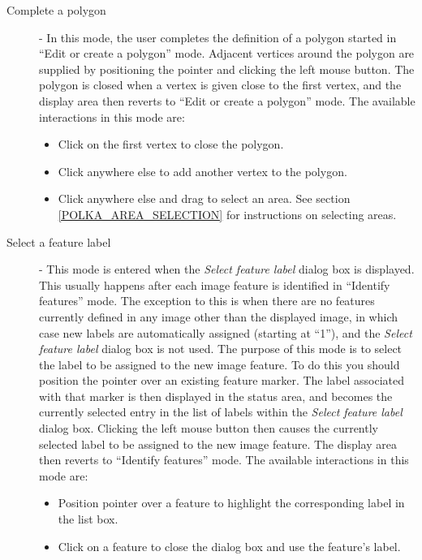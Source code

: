 \documentclass[11pt]{article}
\newcommand{\hyperref}[4]{#2\ref{#4}#3}
\newcommand{\htmlref}[2]{#1}
\newcommand{\xlabel}[1]{}
\newcommand{\mylabel}[1] {\xlabel{#1}\label{#1}}
\begin{document}
\begin{description}
\begin{itemize}
\end{itemize}

\item [\mylabel{POLKA_MODE_2} Complete a polygon] - In this mode, the
user completes the definition of a polygon started in ``\htmlref{Edit or
create a polygon}{POLKA_MODE_1}'' mode. Adjacent vertices around the
polygon are supplied by positioning the pointer and clicking the left
mouse button. The polygon is closed when a vertex is given close to the
first vertex, and the display area then reverts to ``\htmlref{Edit or
create a polygon}{POLKA_MODE_1}'' mode. The available interactions in
this mode are:

\begin{itemize}
\item Click on the first vertex to close the polygon.
\item Click anywhere else to add another vertex to the polygon.
\item Click anywhere else and drag to select an area. \hyperref{Go here}{See
section }{}{POLKA_AREA_SELECTION} for instructions on selecting areas.
\end{itemize}

\item [\mylabel{POLKA_MODE_3} Select a feature label] - This mode is
entered when the \htmlref{\emph{Select feature label}}{POLKA_GET_LABEL}
dialog box is displayed. This usually happens after each image feature is
identified in ``\htmlref{Identify features}{POLKA_MODE_0}'' mode. The
exception to this is when there are no features currently defined in any
image other than the displayed image, in which case new labels are
automatically assigned (starting at ``1''), and the \emph{Select feature
label} dialog box is not used. The purpose of this mode is to select the
label to be assigned to the new image feature. To do this you should
position the pointer over an existing feature marker. The label
associated with that marker is then displayed in the \htmlref{status
area}{POLKA_STATUS_AREA}, and becomes the currently selected entry in
the list of labels within the \emph{Select feature label} dialog box.
Clicking the left mouse button then causes the currently selected label
to be assigned to the new image feature. The display area then reverts to
``\htmlref{Identify features}{POLKA_MODE_0}'' mode.
The available interactions in this mode are:

\begin{itemize}
\item Position pointer over a feature to highlight the corresponding label
in the list box.
\item Click on a feature to close the dialog box and use the feature's label.
\end{itemize}


\end{description}
\end{document}
